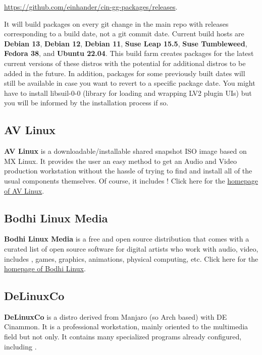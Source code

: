 \url{https://github.com/einhander/cin-gg-packages/releases}.

It will build packages on every git change in the main repo with  
releases corresponding to a build date, not a git commit date.
Current build hosts are \textbf{Debian 13}, \textbf{Debian 12}, \textbf{Debian 11}, 
\textbf{Suse Leap 15.5}, \textbf{Suse Tumbleweed}, \textbf{Fedora 38}, and \textbf{Ubuntu 22.04}.
This build farm creates packages for the latest current versions of these
distros with the potential for additional distros to be added in the future. 
In addition, packages for some previously built dates will still be available
in case you want to revert to a specific package date.  You might have to 
install libsuil-0-0 (library for loading and wrapping LV2 plugin UIs) but
you will be informed by the installation process if so.


\subsection{AV Linux}
\label{sec:AV_Linux}

\textbf{AV Linux} is a downloadable/installable shared snapshot
ISO image based on MX Linux.  It provides the user an easy method to
get an Audio and Video production workstation without the hassle
of trying to find and install all of the usual components
themselves.  Of course, it includes \CGG{}!
%
Click here for the
\href{http://www.bandshed.net/avlinux/}{homepage of AV Linux}.

\subsection{Bodhi Linux Media}
\label{sec:Bodhi_Linux}

\textbf{Bodhi Linux Media} is a free and open source distribution that
comes with a curated list of open source software for digital
artists who work with audio, video, includes \CGG{}, games,
graphics, animations, physical computing, etc.
%
Click here for the
\href{https://gitlab.com/giuseppetorre/bodhilinuxmedia}{homepage of Bodhi Linux}.

\subsection{DeLinuxCo}
\label{sec:delinuxco}

\textbf{DeLinuxCo} is a distro derived from Manjaro (so Arch based) with DE Cinammon. It is a professional workstation, mainly oriented to the multimedia field but not only. It contains many specialized programs already configured, including \CGG{}.

